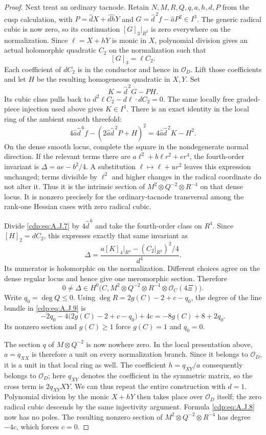 \begin{proof}
Next treat an ordinary tacnode. Retain $N,M,R,Q,q,a,h,d,P$
from the cusp calculation, with
$P=\widehat d X+\widehat{dh}Y$ and
$G=\widehat d^{\,2}f-\widehat aP^2\in I^3$.
The generic radical cubic is now zero, so its continuation
$[G]_3|_{R^3}$ is zero everywhere on the normalization.
Since $\ell=X+hY$ is monic in $X$, polynomial division gives
an actual holomorphic quadratic $C_2$ on the normalization
such that
\[
 [G]_3=\ell C_2.
\]
Each coefficient of $dC_2$ is in the conductor and hence in
$\mathcal O_D$. Lift those coefficients and let $H$ be the
resulting homogeneous quadratic in $X,Y$. Set
\[
 K=\widehat d^{\,2}G-PH.
\]
Its cubic class pulls back to
$d^2\ell C_2-d\ell\cdot dC_2=0$.
The same locally free graded-piece injection used above gives
$K\in I^4$. There is an exact identity in the local ring of
the ambient smooth threefold:
\[
 4\widehat a\widehat d^{\,6}f
 -(2\widehat a\widehat d^{\,2}P+H)^2
 =4\widehat a\widehat d^{\,2}K-H^2.               \tag{A.J.7}\label{cdp:eq:A.J.7}
\]
On the dense smooth locus, complete the square in the
nondegenerate normal direction. If the relevant terms there
are $a\ell^2+b\ell r^2+er^4$, the fourth-order invariant is
$\Delta=ae-b^2/4$. A substitution
$\ell\mapsto\ell+ur^2$ leaves this expression unchanged;
terms divisible by $\ell^2$ and higher changes in the radical
coordinate do not alter it. Thus it is the intrinsic section
of $M^2\otimes Q^{-2}\otimes R^{-4}$ on that dense locus.
It is nonzero precisely for the ordinary-tacnode transversal
among the rank-one Hessian cases with zero radical cubic.

Divide \eqref{cdp:eq:A.J.7} by $4\widehat d^{\,6}$ and take the
fourth-order class on $R^4$. Since
$[H]_2=dC_2$, this expresses exactly that same invariant as
\[
 \Delta=
 \frac{a[K]_4|_{R^4}-(C_2|_{R^2})^2/4}{d^4}.
                                                        \tag{A.J.8}\label{cdp:eq:A.J.8}
\]
Its numerator is holomorphic on the normalization.
Different choices agree on the dense regular locus and hence
give one meromorphic section. Therefore
\[
 0\ne\Delta\in H^0\bigl(C,M^2\otimes Q^{-2}
                    \otimes R^{-4}\otimes\mathcal O_C(4\Xi)\bigr).
                                                        \tag{A.J.9}\label{cdp:eq:A.J.9}
\]
Write $q_0=\deg Q\leq0$. Using
$\deg R=2g(C)-2+c-q_0$, the degree of the line bundle
in \eqref{cdp:eq:A.J.9} is
\[
 -2q_0-4\bigl(2g(C)-2+c-q_0\bigr)+4c
       =-8g(C)+8+2q_0.
\]
Its nonzero section and $g(C)\geq1$ force
$g(C)=1$ and $q_0=0$.

The section $q$ of $M\otimes Q^{-2}$ is now nowhere zero.
In the local presentation above, $a=q_{XX}$ is therefore a
unit on every normalization branch. Since it belongs to
$\mathcal O_D$, it is a unit in that local ring as well.
The coefficient $h=q_{XY}/a$ consequently belongs to
$\mathcal O_D$; here $q_{XY}$ denotes the coefficient in
the symmetric matrix, so the cross term is $2q_{XY}XY$.
We can thus repeat the entire construction with $d=1$.
Polynomial division by the monic $X+hY$ then takes place
over $\mathcal O_D$ itself; the zero radical cubic descends
by the same injectivity argument. Formula \eqref{cdp:eq:A.J.8} now has
no poles. The resulting nonzero section of
$M^2\otimes Q^{-2}\otimes R^{-4}$ has degree $-4c$,
which forces $c=0$.


\end{proof}
